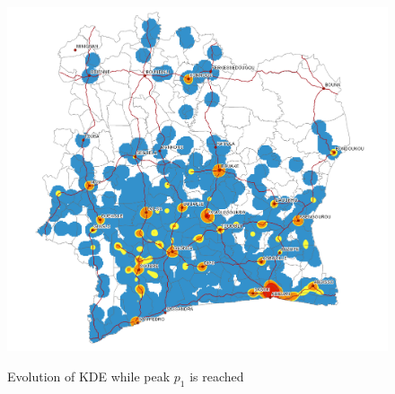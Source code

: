 \begin{figure}
{    \includegraphics[scale = 0.3]{results/images/kernel/l_hour19_kd.pdf}
	\label{fig:subfig1}
}
\caption[KDE evolution while peak $p_1$ is reached]{Evolution of KDE while peak $p_1$ is reached}
\label{fig:subfigureExample}
\end{figure}






